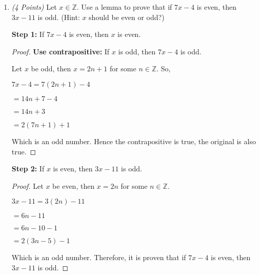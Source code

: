 \documentclass[10pt]{article} %
\newcommand{\Z}{\mathbb{Z}}
\newcommand{\points}[1]{{\it (#1 Points)}}
\begin{document}
\begin{enumerate}
\begin{proof}
 So, $3x + 5 = 3 (2n - 2) + 5$
 
 $ = 6n - 6 + 5$
 
 $ = 6n - 1$
 
 $ = 2 (3n) - 1$
 
 Which is an odd number.  Hence the contrapositive is true then the original is also true.  
 
 \end{proof}
 
 \bigskip

 \item \points{4} Let $x\in \Z$. Use a lemma to prove that if $7x-4$ is even, then $3x-11$ is odd. (Hint: $x$ should be even or odd?)
 
 \bigskip
 
 
 \begin{raggedright}
 {\bf Step 1:} If $7x - 4$ is even, then $x$ is even.  
 \end{raggedright}
 \begin{proof}
 
 {\bf Use contrapositive:}  If $x$ is odd, then $7x - 4$ is odd.  
 
 Let $x$ be odd, then $x = 2n + 1$ for some $n\in \Z$.  So, 
 
 $7x - 4 = 7 (2n + 1) - 4$
 
 $ = 14n + 7 - 4$
 
 $ = 14n + 3$
 
 $ = 2 (7n + 1) + 1$
 
 Which is an odd number.  Hence the contrapositive is true, the original is also true.  
 
 \end{proof}
 
 \begin{raggedright}
 {\bf Step 2:} If $x$ is even, then $3x - 11$ is odd.  
 \end{raggedright}
 \begin{proof}
 Let $x$ be even, then $x = 2n$ for some $n\in \Z$.  
 
 $3x - 11 = 3 (2n) - 11$
 
 $ = 6n - 11$
 
 $ = 6n - 10 - 1$
 
 $ = 2 (3n - 5) - 1$
 
 Which is an odd number.  Therefore, it is proven that if $7x - 4$ is even, then $3x - 11$ is odd.  
 
 \end{proof}
 

\end{enumerate}
\end{document}
